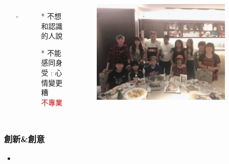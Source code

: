 \documentclass[10pt, conference, compsocconf]{beamer}
\begin{document}
\begin{CJK}{UTF8}{}
\begin{frame}
\begin{columns}
\begin{itemize}
\item[-] \large{}
\vspace{5mm}
\end{itemize}
\begin{itemize}
\item[*]  不想和認識的人說\\
\vspace{5mm}
\item[*]  不能感同身受 : 心情變更糟\\
\vspace{5mm}
\textcolor{red}{不專業}
\vspace{5mm}
\end{itemize}
\begin{figure}[!t]
\begin{flushright}
\includegraphics[width=0.9\textwidth]{Figures/9.jpg}
\end{flushright}
\end{figure}
\end{columns}

\end{frame}

\begin{frame}
\frametitle{創新\&創意}

\begin{itemize}
\item{}
\end{itemize}


\end{frame}
\end{CJK}
\end{document}
